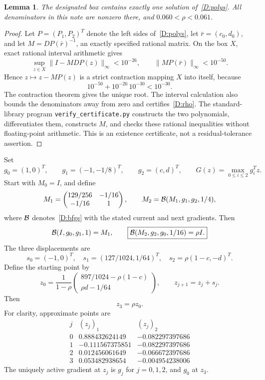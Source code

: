 \documentclass[10pt,oneside,openany]{book}
\newtheorem{lemma}{Lemma}[chapter]
\theoremstyle{remark}\newtheorem{remark}{Remark}[chapter]
\begin{document}
\begin{lemma}\label{D:root}
The designated box contains exactly one solution of~\eqref{D:polys}. All denominators in this note are nonzero there, and $0.060<\rho<0.061$.
\end{lemma}
\begin{proof}
Let $P=(P_1,P_2)^T$ denote the left sides of~\eqref{D:polys}, let $\bar r=(c_0,d_0)$, and let $M=DP(\bar r)^{-1}$, an exactly specified rational matrix. On the box $X$, exact rational interval arithmetic gives
\[
 \sup_{z\in X}\|I-MDP(z)\|_\infty<10^{-26},
 \qquad\|MP(\bar r)\|_\infty<10^{-50}.
\]
Hence $z\mapsto z-MP(z)$ is a strict contraction mapping $X$ into itself, because
\[
 10^{-50}+10^{-26}\,10^{-30}<10^{-30}.
\]
The contraction theorem gives the unique root. The interval calculation also bounds the denominators away from zero and certifies~\eqref{D:rho}. The standard-library program \texttt{verify\_certificate.py} constructs the two polynomials, differentiates them, constructs $M$, and checks these rational inequalities without floating-point arithmetic. This is an existence certificate, not a residual-tolerance assertion.
\end{proof}

Set
\[
 g_0=(1,0)^T,\qquad g_1=(-1,-1/8)^T,\qquad g_2=(c,d)^T,
 \qquad G(z)=\max_{0\le i\le2}g_i^Tz.
\]
Start with $M_0=I$, and define
\[
 M_1=\begin{pmatrix}129/256&-1/16\\-1/16&1\end{pmatrix},
 \qquad M_2=\mathcal B(M_1,g_1,g_2,1/4),
\]
where $\mathcal B$ denotes~\eqref{D:bfgs} with the stated current and next gradients. Then
\begin{equation}\label{D:closure}
 \mathcal B(I,g_0,g_1,1)=M_1,\qquad
 \boxed{\mathcal B(M_2,g_2,g_0,1/16)=\rho I.}
\end{equation}
The three displacements are
\begin{equation}\label{D:steps}
 s_0=(-1,0)^T,\quad s_1=(127/1024,1/64)^T,\quad
 s_2=\rho(1-c,-d)^T.
\end{equation}
Define the starting point by
\begin{equation}\label{D:x0}
 z_0=\frac1{1-\rho}
 \begin{pmatrix}897/1024-\rho(1-c)\\ \rho d-1/64\end{pmatrix},
 \qquad z_{j+1}=z_j+s_j.
\end{equation}
Then
\[
 \boxed{z_3=\rho z_0.}
\]
For clarity, approximate points are
\[
\begin{array}{c|rr}
 j& (z_j)_1&(z_j)_2\\\hline
0& 0.888432624149&-0.082297397686\\
1&-0.111567375851&-0.082297397686\\
2& 0.012456061649&-0.066672397686\\
3& 0.053482938654&-0.004954238006
\end{array}
\]
The uniquely active gradient at $z_j$ is $g_j$ for $j=0,1,2$, and $g_0$ at $z_3$.
\end{document}
